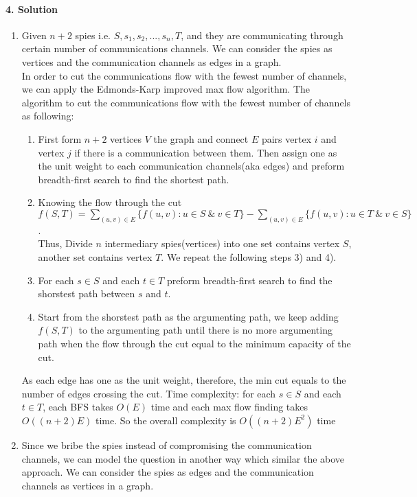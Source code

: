 \documentclass[a4paper]{scrartcl}
\begin{document}
\paragraph{4. Solution}
\label{sec:Question 4}
\begin{enumerate}[label=(\alph{*})]
  \item Given $ n + 2 $ spies i.e. $ S, s_1, s_2, ... , s_n, T$, and they are communicating through certain number of communications channels. We can consider the spies as vertices and the communication channels as edges in a graph.\\
  In order to cut the communications flow with the fewest number of channels, we can apply the Edmonds-Karp improved max flow algorithm. The algorithm to cut the communications flow with the fewest number of channels as following:
  \begin{enumerate}[label=\arabic{*})]
    \item First form $n+2$ vertices $V$ the graph and connect $E$ pairs vertex $i$ and vertex $j$ if there is a communication between them. Then assign one as the unit weight to each communication channels(aka edges) and preform breadth-first search to find the shortest path.
    \item Knowing the flow through the cut $f(S,T)=\sum_{(u,v) \in E} \{ f(u,v): u \in S\ \&\ v \in T \} - \sum_{(u,v) \in E} \{ f(u,v): u \in T\ \&\ v \in S\}$.\\
    Thus, Divide $n$ intermediary spies(vertices) into one set contains vertex $S$, another set contains vertex $T$. We repeat the following steps 3) and 4).
    \item For each $s \in S$ and each $t \in T$ preform breadth-first search to find the shorstest path between $s$ and $t$.
    \item Start from the shorstest path as the argumenting path, we keep adding $f(S,T)$ to the argumenting path until there is no more argumenting path when the flow through the cut equal to the minimum capacity of the cut.
  \end{enumerate}
  As each edge has one as the unit weight, therefore, the min cut equals to the number of edges crossing the cut.
  Time complexity: for each $s \in S$ and each $t \in T$, each BFS takes $O(E)$ time and each max flow finding takes $O((n+2)E)$ time. So the overall complexity is $O((n+2)E^2)$ time
  \item Since we bribe the spies instead of compromising the communication channels, we can model the question in another way which similar the above approach. We can consider the spies as edges and the communication channels as vertices in a graph.\\

\end{enumerate}
\end{document}
